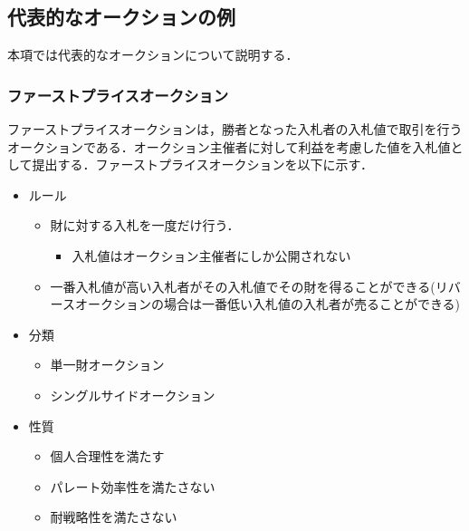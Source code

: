 \hypertarget{ux4ee3ux8868ux7684ux306aux30aaux30fcux30afux30b7ux30e7ux30f3ux306eux4f8b}{%
\subsection{代表的なオークションの例}\label{ux4ee3ux8868ux7684ux306aux30aaux30fcux30afux30b7ux30e7ux30f3ux306eux4f8b}}

本項では代表的なオークションについて説明する．

\hypertarget{ux30d5ux30a1ux30fcux30b9ux30c8ux30d7ux30e9ux30a4ux30b9ux30aaux30fcux30afux30b7ux30e7ux30f3}{%
\subsubsection{ファーストプライスオークション}\label{ux30d5ux30a1ux30fcux30b9ux30c8ux30d7ux30e9ux30a4ux30b9ux30aaux30fcux30afux30b7ux30e7ux30f3}}

ファーストプライスオークションは，勝者となった入札者の入札値で取引を行うオークションである．オークション主催者に対して利益を考慮した値を入札値として提出する．ファーストプライスオークションを以下に示す．

\begin{itemize}
\tightlist
\item
  ルール

  \begin{itemize}
  \tightlist
  \item
    財に対する入札を一度だけ行う．

    \begin{itemize}
    \tightlist
    \item
      入札値はオークション主催者にしか公開されない
    \end{itemize}
  \item
    一番入札値が高い入札者がその入札値でその財を得ることができる(リバースオークションの場合は一番低い入札値の入札者が売ることができる)
  \end{itemize}
\item
  分類

  \begin{itemize}
  \tightlist
  \item
    単一財オークション
  \item
    シングルサイドオークション
  \end{itemize}
\item
  性質

  \begin{itemize}
  \tightlist
  \item
    個人合理性を満たす
  \item
    パレート効率性を満たさない
  \item
    耐戦略性を満たさない
  \end{itemize}
\end{itemize}

